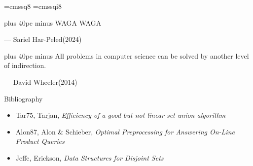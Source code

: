 \documentclass[aspectratio=169]{beamer}
\begin{document}
\font\eightss=cmssq8
\font\eightssi=cmssqi8
\newcommand\quoteAuthorDate[3]{\begingroup
	\baselineskip 10pt
	\parfillskip 0pt
	\interlinepenalty 10000 %
	\leftskip 0pt plus 40pc minus \parindent
	\let\rm=\eightss
	\let\sl=\eightssi
	\everypar{\sl}#1\par
	\nobreak\smallskip
	\noindent\rm--- #2\unskip\enspace(#3)\par
	\endgroup}
\begin{frame}
	\begin{center}
		\item \quoteAuthorDate{WAGA WAGA}{Sariel Har-Peled}{\textcolor{sigma@mainblue}{2024}}
		\item \quoteAuthorDate{All problems in computer science can be solved by another level of indirection.}{David Wheeler}{\textcolor{sigma@mainblue}{2014}}
	\end{center}
\end{frame}

\begin{frame}[allowframebreaks]{Bibliography}
	
	
	\begin{itemize}
		\item Tar75, Tarjan, \textit{Efficiency of a good but not linear set union algorithm}
		\item Alon87, Alon \& Schieber, \textit{Optimal Preprocessing for Answering On-Line Product Queries}
		\item Jeffe, Erickson, \textit{Data Structures for Disjoint Sets}
	\end{itemize}
\end{frame}
\end{document}
